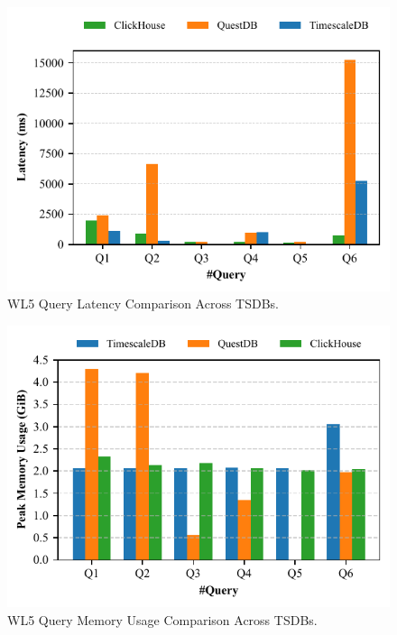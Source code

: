 \documentclass[conference]{IEEEtran}
\begin{document}
\begin{figure}[tb]
\centering
\includegraphics[width=1.0\linewidth]{1_query_latency_ieee.pdf}
\caption{WL5 Query Latency Comparison Across TSDBs.}
\label{fig:query_latency_comparison}
\end{figure}

\begin{figure}[tb]
\centering
\includegraphics[width=1.0\linewidth]{2_query_memory.pdf}
\caption{WL5 Query Memory Usage Comparison Across TSDBs.}
\label{fig:query_memory_comparison}
\end{figure}
\end{document}
